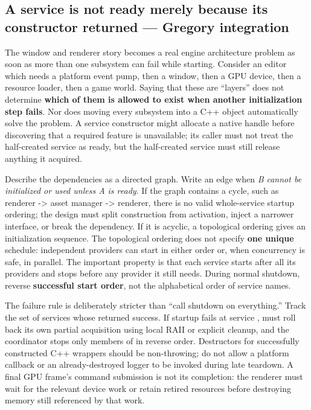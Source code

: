 \subsection{A service is not ready merely because its constructor returned --- Gregory integration}\label{05-engine-i-ch013-a-service-is-not-ready-merely-because-its-constructor-returned-gregory-integration}

\hypertarget{05-engine-i-ch013-a-service-is-not-ready-merely-because-its-constructor-returned-gregory-integration}{}

The window and renderer story becomes a real engine architecture problem as soon as more than one subsystem can fail while starting. Consider an editor which needs a platform event pump, then a window, then a GPU device, then a resource loader, then a game world. Saying that these are ``layers'' does not determine \textbf{which of them is allowed to exist when another initialization step fails}. Nor does moving every subsystem into a C++ object automatically solve the problem. A service constructor might allocate a native handle before discovering that a required feature is unavailable; its caller must not treat the half-created service as ready, but the half-created service must still release anything it acquired.

Describe the dependencies as a directed graph. Write an edge  when \emph{B cannot be initialized or used unless A is ready}. If the graph contains a cycle, such as renderer -\textgreater{} asset manager -\textgreater{} renderer, there is no valid whole-service startup ordering; the design must split construction from activation, inject a narrower interface, or break the dependency. If it is acyclic, a topological ordering gives an initialization sequence. The topological ordering does not specify \textbf{one unique} schedule: independent providers can start in either order or, when concurrency is safe, in parallel. The important property is that each service starts after all its providers and stops before any provider it still needs. During normal shutdown, reverse \textbf{successful start order}, not the alphabetical order of service names.

The failure rule is deliberately stricter than ``call shutdown on everything.'' Track the set  of services whose  returned success. If startup fails at service ,  must roll back its own partial acquisition using local RAII or explicit cleanup, and the coordinator stops only members of  in reverse order. Destructors for successfully constructed C++ wrappers should be non-throwing; do not allow a platform callback or an already-destroyed logger to be invoked during late teardown. A final GPU frame's command submission is not its completion: the renderer must wait for the relevant device work or retain retired resources before destroying memory still referenced by that work.

